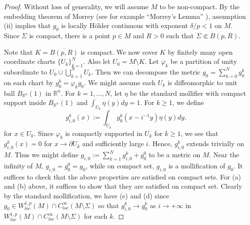 \documentclass[12pt]{amsart}
\newcommand{\hdel}{\tilde{\nabla}}
\theoremstyle{remark}
\numberwithin{equation}{section}
\begin{document}
\begin{proof}
%

Without loss of generality, we will assume $M$ to be non-compact.  By the embedding theorem of Morrey (see for example ``Morrey's Lemma''  \cite[(1.3) ]{adams_morrey_2015}), assumption (ii) implies that $g_0$ is locally H\"older continuous with exponent $\delta/p < 1$ on $M$.  Since $\Sigma$ is compact, there is a point $p \in M$ and $R > 0$ such that $\Sigma \Subset B(p,R)$. 


Note that $K=\overline{B(p,R)}$ is compact. We now cover $K$ by finitely many open coordinate charts $\{U_k\}_{k=1}^N$. Also let $U_0 = M \setminus K$. Let $\varphi_k$ be a partition of unity subordinate to $U_0 \cup \bigcup\limits_{k=1}^N U_k$. Then we can decompose the metric $g_0=\sum_{k=0}^N g^k_0$ on each chart by $g_0^k = \varphi_k g_0$. 
We might assume each $U_k$ is diffeomorphic to unit ball $B_{\mathbb{R}^n}(1)$ in $\mathbb{R}^n$. For $k = 1,\dots,N$, let $\eta$ be the standard mollifier with compact support inside $B_{\mathbb{R}^n}(1)$ and $\int_{U_k} \eta(y)dy = 1$. For $k\geq 1$, we define
    \begin{equation*}
        g_{i,0}^k(x) := \int_{U_k} g_0^k(x-i^{-1}y)\eta(y)dy.
    \end{equation*}
    for $x\in U_k$. Since $\varphi_k$ is compactly supported in $U_k$ for $k\geq 1$, we see that $g^k_{i,0}(x)=0$ for $x\to \partial U_k$ and sufficiently large $i$. Hence, $g^k_{i,0}$ extends trivially on $M$. Thus we might define
$
        g_{i,0}:= \sum\limits_{k=1}^N g_{i,0}^k + g_0^0$ to be a metric on $M$.
  Near the infinity of $M$, $g_{i,0}=g_0^0=g_0$, while on compact set, $g_{i,0}$ is a mollification of $g_0$. It suffices to check that the above properties are satisfied on compact sets. For (a) and (b) above, it suffices to show that they are satisfied on compact set. Clearly by the standard mollification, we have (e) and (d) since $g_0\in W^{1,p}_{loc}(M)\cap C^\infty_{loc}(M\setminus \Sigma)$ so that $g_{i,0}^k\to g_0^k$ as $i\to+\infty$ in  $W^{1,p}_{loc}(M)\cap C^\infty_{loc}(M\setminus \Sigma)$ for each $k$.
    

\end{proof}
\end{document}
